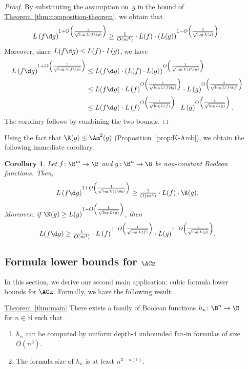 \documentclass[11pt]{article}
\numberwithin{equation}{section}
\newtheorem{corollary}[theorem]{Corollary}
\theoremstyle{definition}
\theoremstyle{plain}
\newcommand{\N}{\mathbb N}
\newcommand{\expref}[2]{\hyperref[#2]{#1~\ref{#2}}}
\theoremstyle{definition}\newtheorem{notation}[theorem]{Notation}\theoremstyle{plain}
\begin{document}
\begin{proof}
By substituting the assumption on~$g$ in the bound of \expref{Theorem}{thm:composition-theorem},
we obtain that 
\[
L\left(f\d g\right)^{1+O\left(\frac{1}{\sqrt{\log L(f\d g)}}\right)}\geq\tfrac{1}{O(m^{4})}\cdot L(f) \cdot\left(L(g)\right)^{1-O\left(\frac{1}{\sqrt{\log L(g)}}\right)}.
\]
Moreover, since $L(f\d g)\le L(f)\cdot L(g)$, we have 
\begin{align*}
L\left(f\d g\right)^{1+O\left(\frac{1}{\sqrt{\log L(f\d g)}}\right)} & \le L(f\d g)\cdot\left(L(f)\cdot L(g)\right)^{O\left(\frac{1}{\sqrt{\log L(f\d g)}}\right)}\\
 & \le L(f\d g)\cdot L\left(f\right)^{O\left(\frac{1}{\sqrt{\log L(f\d g)}}\right)}\cdot L\left(g\right)^{O\left(\frac{1}{\sqrt{\log L(f\d g)}}\right)}\\
 & \le L(f\d g)\cdot L\left(f\right)^{O\left(\frac{1}{\sqrt{\log L(f)}}\right)}\cdot L\left(g\right)^{O\left(\frac{1}{\sqrt{\log L(g)}}\right)}.
\end{align*}
The corollary follows by combining the two bounds. 
\end{proof}
Using the fact that $\K(g)\le\Am^{2}(g)$ (\expref{Proposition}{prop:K-Amb}), we obtain
the following immediate corollary. 
\begin{corollary}
\label{cor:KRW-original-khrapchenko}Let $f\colon\B^{m}\to\B$ and $g\colon\B^{n}\to\B$
be non-constant Boolean functions. Then, 
\[
L\left(f\d g\right)^{1+O\left(\frac{1}{\sqrt{\log L(f\d g)}}\right)}\geq\tfrac{1}{O(m^{4})}\cdot L(f) \cdot\K(g).
\]
Moreover, if $\K(g)\ge L(g)^{1-O\left(\frac{1}{\sqrt{\log L(g)}}\right)}$,
then 
\[
L(f\d g)\ge\tfrac{1}{O(m^{4})}\cdot L\left(f\right)^{1-O\left(\frac{1}{\sqrt{\log L(f)}}\right)}\cdot L(g)^{1-O\left(\frac{1}{\sqrt{\log L(g)}}\right)}.
\]
\end{corollary}


\subsection{\label{subsec:AC0-bounds}Formula lower bounds for \texorpdfstring{$\protect\ACz$}{AC0}}

In this section, we derive our second main application: cubic formula
lower bounds for $\ACz$. Formally, we have the following result.
\begin{restated}{\expref{Theorem}{thm:main}}
There exists a family of Boolean functions $h_{n}\colon\B^{n}\to\B$ for
$n\in\N$ such that 
\begin{enumerate}
\item $h_{n}$ can be computed by uniform depth-$4$ unbounded fan-in formulas
of size $O(n^{3})$. 
\item The formula size of $h_{n}$ is at least $n^{3-o(1)}$.
\end{enumerate}
\end{restated}
\end{document}
